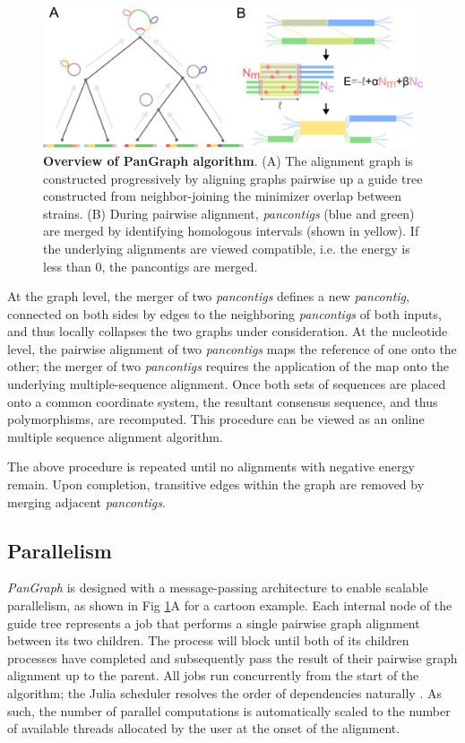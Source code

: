 \documentclass[aps,rmp,reprint,superscriptaddress,notitlepage,10pt]{revtex4-1}
\begin{document}
\begin{figure}[htb]
    \includegraphics[width=.5\textwidth]{algorithm.png}
    \caption{{\bf Overview of PanGraph algorithm}.
    (A) The alignment graph is constructed progressively by aligning graphs pairwise up a guide tree constructed from neighbor-joining the minimizer overlap between strains. 
    (B) During pairwise alignment, \emph{pancontigs} (blue and green)
    are merged by identifying homologous intervals (shown in yellow).
    If the underlying alignments are viewed compatible, i.e. the energy is less than 0, the pancontigs are merged.
    }
    \label{fig:visualization}
\end{figure}

At the graph level, the merger of two \emph{pancontigs} defines a new \emph{pancontig}, connected on both sides by edges to the neighboring \emph{pancontigs} of both inputs, and thus locally collapses the two graphs under consideration.
At the nucleotide level, the pairwise alignment of two \emph{pancontigs} maps the reference of one onto the other; the merger of two \emph{pancontigs} requires the application of the map onto the underlying multiple-sequence alignment.
Once both sets of sequences are placed onto a common coordinate system, the resultant consensus sequence, and thus polymorphisms, are recomputed.
This procedure can be viewed as an online multiple sequence alignment algorithm.

The above procedure is repeated until no alignments with negative energy remain.
Upon completion, transitive edges within the graph are removed by merging adjacent \emph{pancontigs}.

\subsection{Parallelism}
\emph{PanGraph} is designed with a message-passing architecture to enable scalable parallelism, as shown in Fig \ref{fig:visualization}A for a cartoon example.
Each internal node of the guide tree represents a job that performs a single pairwise graph alignment between its two children.
The process will block until both of its children processes have completed and subsequently pass the result of their pairwise graph alignment up to the parent.
All jobs run concurrently from the start of the algorithm; the Julia scheduler resolves the order of dependencies naturally \cite{bezanson2017julia}.
As such, the number of parallel computations is automatically scaled to the number of available threads allocated by the user at the onset of the alignment.
\end{document}
